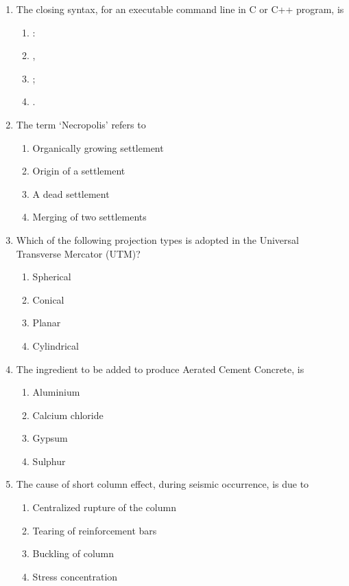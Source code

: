 \documentclass[12pt]{article}
\begin{document}
\begin{enumerate}[label=Q.\arabic*]
	\item The closing syntax, for an executable command line in C or C++ program, is
		\begin{multicols}{4}
			\begin{enumerate}
				\item :
				\item ,
				\item ;
				\item .
			\end{enumerate}
		\end{multicols}

	\item The term ‘Necropolis’ refers to
		\begin{multicols}{2}
			\begin{enumerate}
				\item Organically growing settlement
				\item Origin of a settlement
				\item A dead settlement
				\item Merging of two settlements
			\end{enumerate}
		\end{multicols}

	\item Which of the following projection types is adopted in the Universal Transverse Mercator (UTM)?
		\begin{multicols}{2}
			\begin{enumerate}
				\item Spherical
				\item Conical
				\item Planar
				\item Cylindrical
			\end{enumerate}
		\end{multicols}

	\item The ingredient to be added to produce Aerated Cement Concrete, is
		\begin{multicols}{2}
			\begin{enumerate}
				\item Aluminium
				\item Calcium chloride
				\item Gypsum
				\item Sulphur
			\end{enumerate}
		\end{multicols}
		\newpage
	\item The cause of short column effect, during seismic occurrence, is due to
		\begin{multicols}{2}
			\begin{enumerate}
				\item Centralized rupture of the column
				\item Tearing of reinforcement bars
				\item Buckling of column
				\item Stress concentration
			\end{enumerate}
		\end{multicols}


\end{enumerate}
\end{document}
